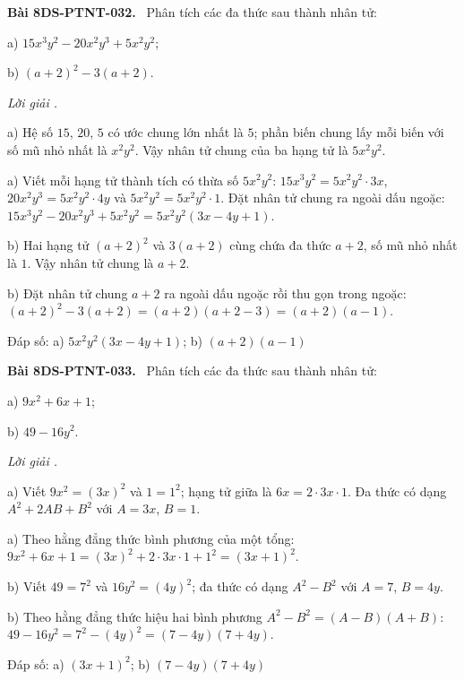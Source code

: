 \documentclass[12pt,a4paper]{article}
\newenvironment{problem}[1][]{\par\medskip\noindent\textbf{Bài #1.}\ }{\par}
\newenvironment{solution}[1][]{\par\noindent\textit{Lời giải #1.}\par}{\par}
\begin{document}
\begin{problem}[8DS-PTNT-032]
Phân tích các đa thức sau thành nhân tử:

a) $15x^3y^2 - 20x^2y^3 + 5x^2y^2$;

b) $(a + 2)^2 - 3(a + 2)$.

\begin{solution}
a) Hệ số $15$, $20$, $5$ có ước chung lớn nhất là $5$; phần biến chung lấy mỗi biến với số mũ nhỏ nhất là $x^2y^2$. Vậy nhân tử chung của ba hạng tử là $5x^2y^2$.

a) Viết mỗi hạng tử thành tích có thừa số $5x^2y^2$: $15x^3y^2 = 5x^2y^2 \cdot 3x$, $20x^2y^3 = 5x^2y^2 \cdot 4y$ và $5x^2y^2 = 5x^2y^2 \cdot 1$. Đặt nhân tử chung ra ngoài dấu ngoặc: $15x^3y^2 - 20x^2y^3 + 5x^2y^2 = 5x^2y^2(3x - 4y + 1)$.

b) Hai hạng tử $(a + 2)^2$ và $3(a + 2)$ cùng chứa đa thức $a + 2$, số mũ nhỏ nhất là $1$. Vậy nhân tử chung là $a + 2$.

b) Đặt nhân tử chung $a + 2$ ra ngoài dấu ngoặc rồi thu gọn trong ngoặc: $(a + 2)^2 - 3(a + 2) = (a + 2)(a + 2 - 3) = (a + 2)(a - 1)$.

Đáp số: a) $\boxed{5x^2y^2(3x - 4y + 1)}$; b) $\boxed{(a + 2)(a - 1)}$
\end{solution}
\end{problem}

\begin{problem}[8DS-PTNT-033]
Phân tích các đa thức sau thành nhân tử:

a) $9x^2 + 6x + 1$;

b) $49 - 16y^2$.

\begin{solution}
a) Viết $9x^2 = (3x)^2$ và $1 = 1^2$; hạng tử giữa là $6x = 2 \cdot 3x \cdot 1$. Đa thức có dạng $A^2 + 2AB + B^2$ với $A = 3x$, $B = 1$.

a) Theo hằng đẳng thức bình phương của một tổng: $9x^2 + 6x + 1 = (3x)^2 + 2 \cdot 3x \cdot 1 + 1^2 = (3x + 1)^2$.

b) Viết $49 = 7^2$ và $16y^2 = (4y)^2$; đa thức có dạng $A^2 - B^2$ với $A = 7$, $B = 4y$.

b) Theo hằng đẳng thức hiệu hai bình phương $A^2 - B^2 = (A - B)(A + B)$: $49 - 16y^2 = 7^2 - (4y)^2 = (7 - 4y)(7 + 4y)$.

Đáp số: a) $\boxed{(3x + 1)^2}$; b) $\boxed{(7 - 4y)(7 + 4y)}$
\end{solution}
\end{problem}
\end{document}
